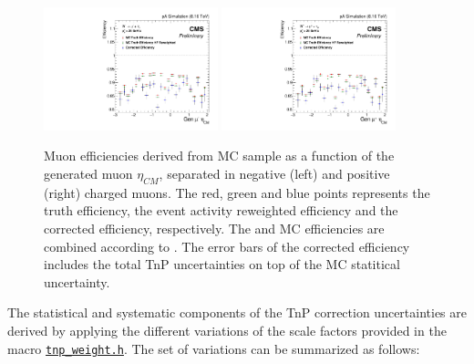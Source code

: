 \begin{figure}[htb!]
 \begin{center}
   \includegraphics[width=0.45\textwidth]{Figures/WBoson/Analysis/Efficiency/Muon/PA/eff1D_EtaCM_MC_WToMuNu_PA_Minus_Total_HFCorr}
   \includegraphics[width=0.45\textwidth]{Figures/WBoson/Analysis/Efficiency/Muon/PA/eff1D_EtaCM_MC_WToMuNu_PA_Plus_Total_HFCorr}
 \end{center}
 \caption{Muon efficiencies derived from \WToMuNu \POWHEG MC sample as a function of the generated muon $\eta_{CM}$, separated in negative (left) and positive (right) charged muons. The red, green and blue points represents the truth efficiency, the event activity reweighted efficiency and the corrected efficiency, respectively. The \pPb and \Pbp MC efficiencies are combined according to . The error bars of the corrected efficiency includes the total TnP uncertainties on top of the MC statitical uncertainty.}
 \label{fig:CorrEfficiency_HFCorr}
\end{figure}

The statistical and systematic components of the TnP correction uncertainties are derived by applying the different variations of the scale factors provided in the macro \href{https://github.com/CMS-HIN-dilepton/MuonAnalysis-TagAndProbe/blob/80X_HI/macros/tnp_weight.h}{\texttt{tnp\_weight.h}}. The set of variations can be summarized as follows:

